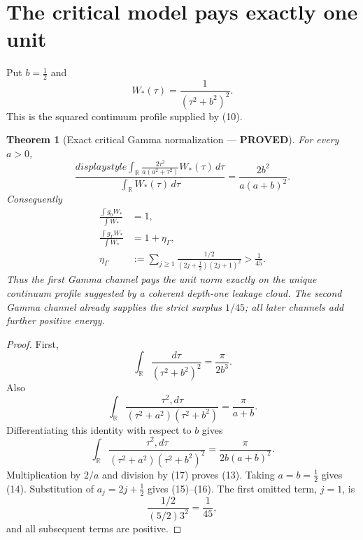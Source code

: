 \documentclass[11pt]{article}
\newcommand{\PROVED}{\textcolor{green!40!black}{\textbf{PROVED}}}
\newtheorem{theorem}{Theorem}
\begin{document}
\section{The critical model pays exactly one unit}

Put $b=\frac12$ and
\begin{equation}
 W_*(\tau)=\frac1{(\tau^2+b^2)^2}.                         \tag{12}
\end{equation}
This is the squared continuum profile supplied by (10).

\begin{theorem}[Exact critical Gamma normalization --- \PROVED]
For every $a>0$,
\begin{equation}
 \frac{displaystyle
  \int_{\mathbb R}
  \frac{2\tau^2}{a(a^2+\tau^2)}W_*(\tau)\,d\tau}
 {\displaystyle\int_{\mathbb R}W_*(\tau)\,d\tau}
 =\frac{2b^2}{a(a+b)^2}.                                   \tag{13}
\end{equation}
Consequently
\begin{align}
 \frac{\int g_0W_*}{\int W_*}&=1,                         \tag{14}\\
 \frac{\int g_\Gamma W_*}{\int W_*}
 &=1+\eta_\Gamma,                                         \tag{15}\\
 \eta_\Gamma
 &:=\sum_{j\ge1}
 \frac{1/2}{(2j+\frac12)(2j+1)^2}
 >\frac1{45}.                                              \tag{16}
\end{align}
Thus the first Gamma channel pays the unit norm exactly on the unique
continuum profile suggested by a coherent depth-one leakage cloud.  The
second Gamma channel already supplies the strict surplus $1/45$; all
later channels add further positive energy.
\end{theorem}

\begin{proof}
First,
\begin{equation}
 \int_{\mathbb R}\frac{d\tau}{(\tau^2+b^2)^2}
 =\frac{\pi}{2b^3}.                                       \tag{17}
\end{equation}
Also
\[
 \int_{\mathbb R}
 \frac{\tau^2,d\tau}{(\tau^2+a^2)(\tau^2+b^2)}
 =\frac\pi{a+b}.
\]
Differentiating this identity with respect to $b$ gives
\begin{equation}
 \int_{\mathbb R}
 \frac{\tau^2,d\tau}
      {(\tau^2+a^2)(\tau^2+b^2)^2}
 =\frac\pi{2b(a+b)^2}.                                    \tag{18}
\end{equation}
Multiplication by $2/a$ and division by (17) proves (13).  Taking
$a=b=\frac12$ gives (14).  Substitution of
$a_j=2j+\frac12$ gives (15)--(16).  The first omitted term, $j=1$, is
\[
 \frac{1/2}{(5/2)3^2}=\frac1{45},
\]
and all subsequent terms are positive.
\end{proof}
\end{document}

